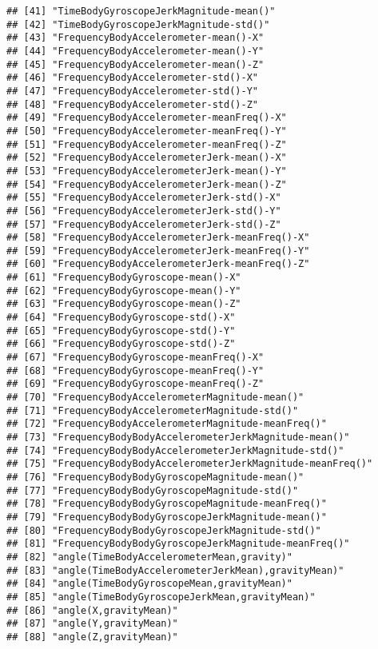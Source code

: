 \documentclass[
]{article}
\begin{document}
\begin{verbatim}
## [41] "TimeBodyGyroscopeJerkMagnitude-mean()"                 
## [42] "TimeBodyGyroscopeJerkMagnitude-std()"                  
## [43] "FrequencyBodyAccelerometer-mean()-X"                   
## [44] "FrequencyBodyAccelerometer-mean()-Y"                   
## [45] "FrequencyBodyAccelerometer-mean()-Z"                   
## [46] "FrequencyBodyAccelerometer-std()-X"                    
## [47] "FrequencyBodyAccelerometer-std()-Y"                    
## [48] "FrequencyBodyAccelerometer-std()-Z"                    
## [49] "FrequencyBodyAccelerometer-meanFreq()-X"               
## [50] "FrequencyBodyAccelerometer-meanFreq()-Y"               
## [51] "FrequencyBodyAccelerometer-meanFreq()-Z"               
## [52] "FrequencyBodyAccelerometerJerk-mean()-X"               
## [53] "FrequencyBodyAccelerometerJerk-mean()-Y"               
## [54] "FrequencyBodyAccelerometerJerk-mean()-Z"               
## [55] "FrequencyBodyAccelerometerJerk-std()-X"                
## [56] "FrequencyBodyAccelerometerJerk-std()-Y"                
## [57] "FrequencyBodyAccelerometerJerk-std()-Z"                
## [58] "FrequencyBodyAccelerometerJerk-meanFreq()-X"           
## [59] "FrequencyBodyAccelerometerJerk-meanFreq()-Y"           
## [60] "FrequencyBodyAccelerometerJerk-meanFreq()-Z"           
## [61] "FrequencyBodyGyroscope-mean()-X"                       
## [62] "FrequencyBodyGyroscope-mean()-Y"                       
## [63] "FrequencyBodyGyroscope-mean()-Z"                       
## [64] "FrequencyBodyGyroscope-std()-X"                        
## [65] "FrequencyBodyGyroscope-std()-Y"                        
## [66] "FrequencyBodyGyroscope-std()-Z"                        
## [67] "FrequencyBodyGyroscope-meanFreq()-X"                   
## [68] "FrequencyBodyGyroscope-meanFreq()-Y"                   
## [69] "FrequencyBodyGyroscope-meanFreq()-Z"                   
## [70] "FrequencyBodyAccelerometerMagnitude-mean()"            
## [71] "FrequencyBodyAccelerometerMagnitude-std()"             
## [72] "FrequencyBodyAccelerometerMagnitude-meanFreq()"        
## [73] "FrequencyBodyBodyAccelerometerJerkMagnitude-mean()"    
## [74] "FrequencyBodyBodyAccelerometerJerkMagnitude-std()"     
## [75] "FrequencyBodyBodyAccelerometerJerkMagnitude-meanFreq()"
## [76] "FrequencyBodyBodyGyroscopeMagnitude-mean()"            
## [77] "FrequencyBodyBodyGyroscopeMagnitude-std()"             
## [78] "FrequencyBodyBodyGyroscopeMagnitude-meanFreq()"        
## [79] "FrequencyBodyBodyGyroscopeJerkMagnitude-mean()"        
## [80] "FrequencyBodyBodyGyroscopeJerkMagnitude-std()"         
## [81] "FrequencyBodyBodyGyroscopeJerkMagnitude-meanFreq()"    
## [82] "angle(TimeBodyAccelerometerMean,gravity)"              
## [83] "angle(TimeBodyAccelerometerJerkMean),gravityMean)"     
## [84] "angle(TimeBodyGyroscopeMean,gravityMean)"              
## [85] "angle(TimeBodyGyroscopeJerkMean,gravityMean)"          
## [86] "angle(X,gravityMean)"                                  
## [87] "angle(Y,gravityMean)"                                  
## [88] "angle(Z,gravityMean)"
\end{verbatim}
\end{document}
